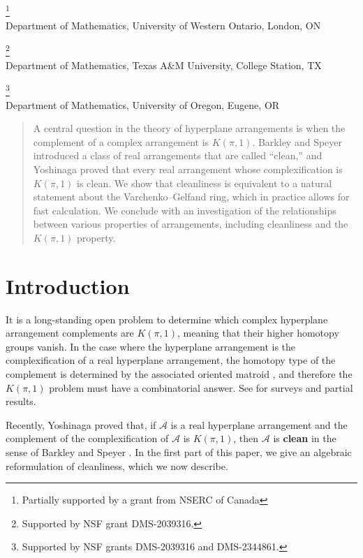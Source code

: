 \documentclass[11pt]{article}
\theoremstyle{definition}
\newcommand{\<}{\left<}
\renewcommand{\>}{\right>}
\newcommand{\cA}{\mathcal{A}}
\begin{document}
\\

\footnote{Partially supported by a grant from NSERC of Canada}\\
Department of Mathematics, University of Western Ontario, London, ON
\vspace{.1in}

\footnote{Supported by NSF grant DMS-2039316.}\\
Department of Mathematics, Texas A\&M University, College Station, TX
\vspace{.1in}

\footnote{Supported by NSF grants DMS-2039316 and DMS-2344861.}\\
Department of Mathematics, University of Oregon, Eugene, OR\\

{\small
\begin{quote}
A central question in the theory of hyperplane arrangements is when the complement of a complex
arrangement is $K(\pi,1)$.  
Barkley and Speyer introduced a class of real arrangements that are called ``clean,'' and
Yoshinaga proved that every real arrangement whose complexification is $K(\pi,1)$ is clean.
We show that cleanliness is equivalent to a natural statement about the Varchenko--Gelfand ring, which in practice allows
for fast calculation.  We conclude with an investigation of the relationships between various properties of arrangements, including cleanliness and the $K(\pi,1)$ property.
\end{quote} }

\section{Introduction}
It is a long-standing open problem to determine which complex hyperplane arrangement complements are $K(\pi,1)$, meaning that their higher homotopy groups
vanish.  In the case where the hyperplane arrangement is the complexification of a real hyperplane arrangement,
the homotopy type of the complement is determined by the associated oriented matroid \cite[Theorem 1]{salvetti}, and therefore the $K(\pi,1)$ problem
must have a combinatorial answer.  See \cite{Falk-Randell2,FR86,yoshinaga-survey} for surveys and partial results.

Recently, Yoshinaga proved that, if $\cA$ is a real hyperplane arrangement and the complement of the complexification of $\cA$
is $K(\pi,1)$, then $\cA$ is {\bf clean} in the sense of Barkley and Speyer \cite{Barkley-Speyer,yoshinaga-spheres}. 
In the first part of this paper, we give an algebraic reformulation of cleanliness,
which we now describe.
\end{document}
